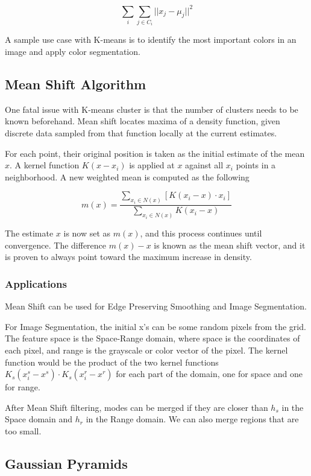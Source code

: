 \documentclass{article}
\begin{document}
\begin{multicols}{2}
$$
\sum_{i}\sum_{j \in C_i} ||x_j - \mu_j||^2
$$

A sample use case with K-means is to identify the most important colors in an image and apply color segmentation.

\subsection{Mean Shift Algorithm}

One fatal issue with K-means cluster is that the number of clusters needs to be known beforehand. Mean shift locates maxima of a density function, given discrete data sampled from that function locally at the current estimates.

For each point, their original position is taken as the initial estimate of the mean $x$. A kernel function $K(x-x_i)$ is applied at $x$ against all $x_i$ points in a neighborhood. A new weighted mean is computed as the following

$$
m(x) = \frac{\sum _{x_i \in N(x)}[K(x_i-x) \cdot x_i]}{\sum _{x_i \in N(x)}K(x_i-x)}
$$

The estimate $x$ is now set as $m(x)$, and this process continues until convergence. The difference $m(x) - x$ is known as the mean shift vector, and it is proven to always point toward the maximum increase in density.

\subsubsection{Applications}

Mean Shift can be used for Edge Preserving Smoothing and Image Segmentation. 

For Image Segmentation, the initial x's can be some random pixels from the grid. The feature space is the Space-Range domain, where space is the coordinates of each pixel, and range is the grayscale or color vector of the pixel. The kernel function would be the product of the two kernel functions $K_s(x_i^s - x^s) \cdot K_s(x_i^r - x^r)$ for each part of the domain, one for space and one for range.

After Mean Shift filtering, modes can be merged if they are closer than $h_s$ in the Space domain and $h_r$ in the Range domain. We can also merge regions that are too small.

\subsection{Gaussian Pyramids}


\end{multicols}
\end{document}
